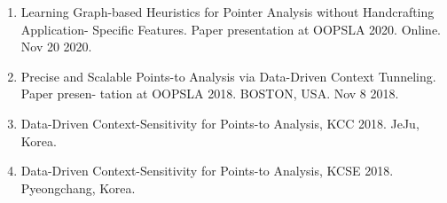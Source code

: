 \documentclass[letterpaper,11pt]{article}
\begin{document}
\begin{enumerate}
  \item{Learning Graph-based Heuristics for Pointer Analysis without Handcrafting Application- Specific Features. Paper presentation at OOPSLA 2020. Online. Nov 20 2020.}
 
  \item{Precise and Scalable Points-to Analysis via Data-Driven Context Tunneling. Paper presen- tation at OOPSLA 2018. BOSTON, USA. Nov 8 2018.}
 
  \item{Data-Driven Context-Sensitivity for Points-to Analysis, KCC 2018. JeJu, Korea.}
 
  \item{Data-Driven Context-Sensitivity for Points-to Analysis, KCSE 2018. Pyeongchang, Korea.}
\end{enumerate}





\end{document}
